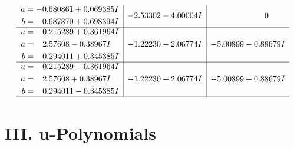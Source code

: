 \documentclass[1p]{elsarticle_modified}
\theoremstyle{definition}
\begin{document}
$$\begin{array}{c|c|c}
\begin{aligned}
a &= -0.680861 + 0.069385 I \\
b &= \phantom{-}0.687870 + 0.698394 I\end{aligned}
 & -2.53302 - 4.00004 I & \phantom{-0.000000 } 0 \\ \hline\begin{aligned}
u &= \phantom{-}0.215289 + 0.361964 I \\
a &= \phantom{-}2.57608 - 0.38967 I \\
b &= \phantom{-}0.294011 + 0.345385 I\end{aligned}
 & -1.22230 - 2.06774 I & -5.00899 - 0.88679 I \\ \hline\begin{aligned}
u &= \phantom{-}0.215289 - 0.361964 I \\
a &= \phantom{-}2.57608 + 0.38967 I \\
b &= \phantom{-}0.294011 - 0.345385 I\end{aligned}
 & -1.22230 + 2.06774 I & -5.00899 + 0.88679 I\\
 \hline 
 \end{array}$$\newpage
\newpage\renewcommand{\arraystretch}{1}
\centering \section*{ III. u-Polynomials}
\end{document}
